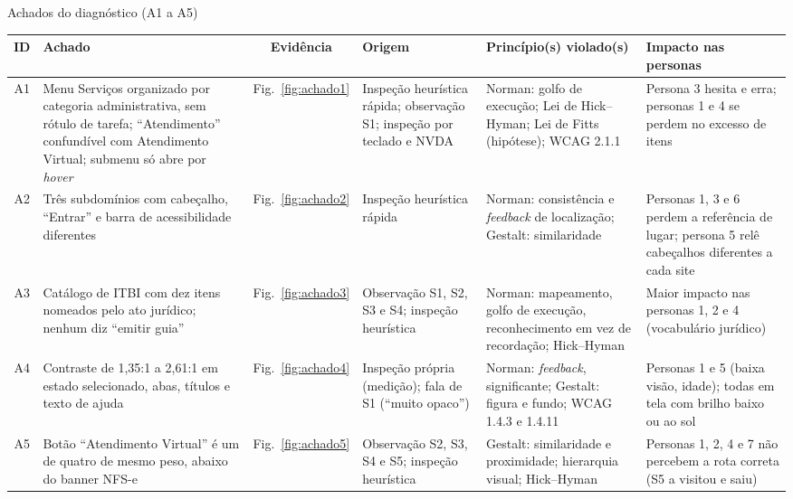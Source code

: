 \documentclass[
  12pt,
  oneside,
  a4paper,
  chapter=TITLE,
  section=TITLE,
  english,
  brazilian
]{abntex2}
\renewcommand{\fonte}[1]{\par\vspace{3pt}{\footnotesize\raggedright\noindent Fonte: #1\par}\vspace{4pt}}%
\begin{document}
\begin{landscape}
\begin{quadro}[!htbp]
  \caption{Achados do diagnóstico (A1 a A5)}\label{qua:achados1}
  \centering\footnotesize
  \begin{tabularx}{\linewidth}{|c|Y|c|p{3.2cm}|p{4.2cm}|Y|}\hline
    ID & Achado & Evidência & Origem & Princípio(s) violado(s) & Impacto nas personas \\\hline
    A1 & Menu Serviços organizado por categoria administrativa, sem rótulo de tarefa; ``Atendimento'' confundível com Atendimento Virtual; submenu só abre por \textit{hover} & Fig.~\ref{fig:achado1} & Inspeção heurística rápida; observação S1; inspeção por teclado e NVDA & Norman: golfo de execução; Lei de Hick--Hyman; Lei de Fitts (hipótese); WCAG 2.1.1 & Persona 3 hesita e erra; personas 1 e 4 se perdem no excesso de itens \\\hline
    A2 & Três subdomínios com cabeçalho, ``Entrar'' e barra de acessibilidade diferentes & Fig.~\ref{fig:achado2} & Inspeção heurística rápida & Norman: consistência e \textit{feedback} de localização; Gestalt: similaridade & Personas 1, 3 e 6 perdem a referência de lugar; persona 5 relê cabeçalhos diferentes a cada site \\\hline
    A3 & Catálogo de ITBI com dez itens nomeados pelo ato jurídico; nenhum diz ``emitir guia'' & Fig.~\ref{fig:achado3} & Observação S1, S2, S3 e S4; inspeção heurística & Norman: mapeamento, golfo de execução, reconhecimento em vez de recordação; Hick--Hyman & Maior impacto nas personas 1, 2 e 4 (vocabulário jurídico) \\\hline
    A4 & Contraste de 1,35:1 a 2,61:1 em estado selecionado, abas, títulos e texto de ajuda & Fig.~\ref{fig:achado4} & Inspeção própria (medição); fala de S1 (``muito opaco'') & Norman: \textit{feedback}, significante; Gestalt: figura e fundo; WCAG 1.4.3 e 1.4.11 & Personas 1 e 5 (baixa visão, idade); todas em tela com brilho baixo ou ao sol \\\hline
    A5 & Botão ``Atendimento Virtual'' é um de quatro de mesmo peso, abaixo do banner NFS-e & Fig.~\ref{fig:achado5} & Observação S2, S3, S4 e S5; inspeção heurística & Gestalt: similaridade e proximidade; hierarquia visual; Hick--Hyman & Personas 1, 2, 4 e 7 não percebem a rota correta (S5 a visitou e saiu) \\\hline
  \end{tabularx}
  \fonte{Elaborado pelos autores (2026).}
\end{quadro}
\end{landscape}
\end{document}
